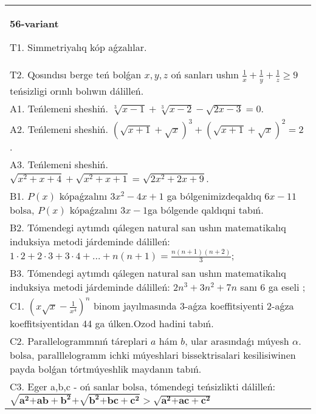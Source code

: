 \documentclass{article}
\begin{document}
\begin{tabular}{m{17cm}}
\textbf{56-variant}
\newline

T1. Simmetriyalıq kóp aǵzalılar. \\
T2. Qosındısı berge teń bolǵan \(x,y,z\) oń sanları ushın \(\frac{1}{x} + \frac{1}{y} + \frac{1}{z} \geq 9\) teńsizligi orınlı bolıwın dálilleń. \\
A1. Teńlemeni sheshiń. \(\sqrt[3]{x - 1} + \sqrt[3]{x - 2} - \sqrt{2x - 3} = 0\). \\
A2. Teńlemeni sheshiń. \((\sqrt{x + 1} + \sqrt{x})^{3} + (\sqrt{x + 1} + \sqrt{x})^{2} = 2\). \\
A3. Teńlemeni sheshiń. \(\sqrt{x^{2} + x + 4} + \sqrt{x^{2} + x + 1} = \sqrt{2x^{2} + 2x + 9}\). \\
B1. \(P(x)\) kópaǵzalını \(3x^{2} - 4x + 1\) ga bólgenimizdeqaldıq \(6x - 11\) bolsa, \(P(x)\) kópaǵzalını \(3x - 1\)ga bólgende qaldıqni tabıń. \\
B2. Tómendegi aytımdı qálegen natural san ushın matematikalıq induksiya metodi járdeminde dálilleń: \(1 \cdot 2 + 2 \cdot 3 + 3 \cdot 4 + ... + n(n + 1) = \frac{n(n + 1)(n + 2)}{3}\); \\
B3. Tómendegi aytımdı qálegen natural san ushın matematikalıq induksiya metodi járdeminde dálilleń: \(2n^{3} + 3n^{2} + 7n\) sanı 6 ga eseli ; \\
C1. \(\left( x\sqrt{x} - \frac{1}{x^{4}} \right)^{n}\) binom jayılmasında 3-aǵza koeffitsiyenti 2-aǵza koeffitsiyentidan 44 ga úlken.Ozod hadini tabıń. \\
C2. Parallelogrammnıń táreplari \(a\) hám \(b\), ular arasındaǵı múyesh \(\alpha\). bolsa, paralllelogramm ichki múyeshlari bissektrisalari kesilisiwinen payda bolǵan tórtmúyeshlik maydanın tabıń. \\
C3. Eger a,b,c - oń sanlar bolsa, tómendegi teńsizlikti dálilleń: \(\sqrt{\mathbf{a}^{\mathbf{2}}\mathbf{+ ab +}\mathbf{b}^{\mathbf{2}}}\mathbf{+}\sqrt{\mathbf{b}^{\mathbf{2}}\mathbf{+ bc +}\mathbf{c}^{\mathbf{2}}}\mathbf{>}\sqrt{\mathbf{a}^{\mathbf{2}}\mathbf{+ ac +}\mathbf{c}^{\mathbf{2}}}\) \\

\end{tabular}
\vspace{1cm}
\end{document}

